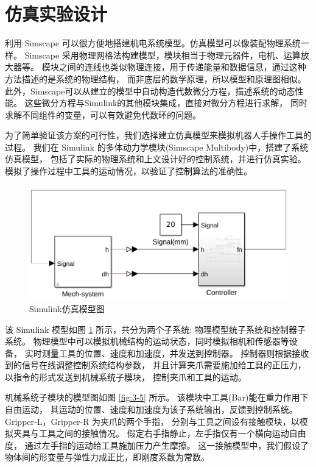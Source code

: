 \section{仿真实验设计}
利用 Simscape 可以很方便地搭建机电系统模型。仿真模型可以像装配物理系统一样。
Simscape 采用物理网格法构建模型，模块相当于物理元器件，电机、运算放大器等。
模块之间的连线也类似物理连接，用于传递能量和数据信息，通过这种方法描述的是系统的物理结构，
而非底层的数学原理，所以模型和原理图相似。
此外，Simscape可以从建立的模型中自动构造代数微分方程，描述系统的动态性能。
这些微分方程与Simulink的其他模块集成，直接对微分方程进行求解，
同时求解不同组件的变量，可以有效避免代数环的问题。

为了简单验证该方案的可行性，我们选择建立仿真模型来模拟机器人手操作工具的过程。
我们在 Simulink 的多体动力学模块(Simscape Multibody)中，搭建了系统仿真模型，
包括了实际的物理系统和上文设计好的控制系统，并进行仿真实验。
模拟了操作过程中工具的运动情况，以验证了控制算法的准确性。

\begin{figure}[!ht]
  \centering
  \includegraphics[scale=0.60]{chapter03/pic/3-4}
  \caption{Simulink仿真模型图}
  \label{fig:3-4}
  \vspace{-0.3cm}
\end{figure}

该 Simulink 模型如图 \ref{fig:3-4} 所示，共分为两个子系统:
物理模型统子系统和控制器子系统。
物理模型中可以模拟机械结构的运动状态，同时模拟相机和传感器等设备，
实时测量工具的位置、速度和加速度，并发送到控制器。
控制器则根据接收到的信号在线调整控制系统结构参数，
并且计算夹爪需要施加给工具的正压力，以指令的形式发送到机械系统子模块，
控制夹爪和工具的运动。

机械系统子模块的模型图如图 \ref{fig:3-5} 所示。
该模块中工具(Bar)能在重力作用下自由运动，
其运动的位置、速度和加速度为该子系统输出，反馈到控制系统。
Gripper-L，Gripper-R 为夹爪的两个手指，
分别与工具之间设有接触模块，以模拟夹具与工具之间的接触情况。
假定右手指静止，左手指仅有一个横向运动自由度，
通过左手指的运动给工具施加压力产生摩擦。
这一接触模型中，我们假设了物体间的形变量与弹性力成正比，即刚度系数为常数。

